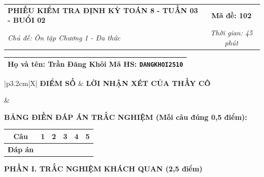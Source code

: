 \documentclass[12pt,a4paper]{article}
\begin{document}
\newpage


\noindent
\begin{tabularx}{\linewidth}{|X|c|}
\hline
\textbf{PHIẾU KIỂM TRA ĐỊNH KỲ TOÁN 8 - TUẦN 03 - BUỔI 02} & \textbf{Mã đề: 102} \\
\textit{Chủ đề: Ôn tập Chương 1 - Đa thức} & \textit{Thời gian: 45 phút} \\
\hline
\end{tabularx}

\vspace{1mm}

\noindent
\begin{tabularx}{\linewidth}{|X|}
\hline
\rule[-2mm]{0pt}{7.5mm}\textbf{Họ và tên:} \textbf{\large Trần Đăng Khôi} \hfill \textbf{Mã HS:} \texttt{DANGKHOI2510} \quad \\
\hline
\end{tabularx}

\vspace{1mm}

\noindent
\begin{tabularx}{\linewidth}{|p{3.2cm}|X|}
\hline
\centering\textbf{ĐIỂM SỐ} & \centering\textbf{LỜI NHẬN XÉT CỦA THẦY CÔ} \tabularnewline
\hline
\rule{0pt}{1.3cm} & \tabularnewline
\hline
\end{tabularx}

\vspace{1.2mm}

\noindent\textbf{BẢNG ĐIỀN ĐÁP ÁN TRẮC NGHIỆM (Mỗi câu đúng 0,5 điểm):}
\vspace{0.8mm}

\noindent
\renewcommand{\arraystretch}{1.35}
\begin{tabularx}{\linewidth}{|c|*{5}{>{\centering\arraybackslash}X|}}
\hline
\textbf{Câu} & \textbf{1} & \textbf{2} & \textbf{3} & \textbf{4} & \textbf{5} \\
\hline
\textbf{Đáp án} & & & & & \\
\hline
\end{tabularx}
\renewcommand{\arraystretch}{1.0}

\vspace{1.5mm}

\noindent\textbf{\large PHẦN I. TRẮC NGHIỆM KHÁCH QUAN (2,5 điểm)}
\vspace{1mm}
\end{document}
